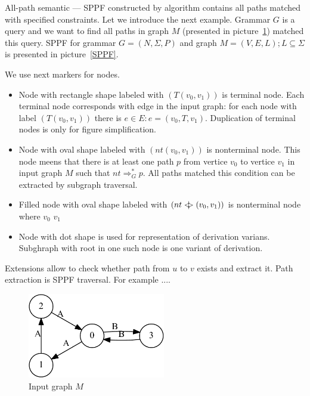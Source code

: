 \documentclass{sig-alternate} %
\begin{document}
All-path semantic --- SPPF constructed by algorithm contains all paths matched with specified constraints. 
Let we introduce the next example. Grammar $G$ is a query and we want to find all paths in graph $M$ (presented in picture~\ref{input}) matched this query. SPPF for grammar $G = (N, \Sigma ,P)$ and graph $M = (V,E,L); L \subseteq \Sigma$ 
is presented in picture~\ref{SPPF}. 

We use next markers for nodes.
\begin{itemize}
    \item Node with rectangle shape labeled with $(T (v_0, v_1))$ is terminal node. Each terminal node corresponds with edge in the input graph: for each node with label $(T (v_0, v_1))$ there is $e\in E: e=(v_0,T,v_1)$.
    Duplication of terminal nodes is only for figure simplification.
    \item Node with oval shape labeled with $(nt (v_0, v_1))$ is nonterminal node. 
    This node meens that there is at least one path $p$ from vertice $v_0$ to vertice $v_1$ in input graph $M$ such that $nt \Rightarrow^*_G p$.
    All paths matched this condition can be extracted by subgraph traversal. 
    \item Filled node with oval shape labeled with $(nt <\mkern-11mu | \mkern-11mu> (v_0, v_1))$ is nonterminal node where $v_0$ $v_1$    
    \item Node with dot shape is used for representation of derivation varians. Subghraph with root in one such node is one variant of derivation. 
\end{itemize}
Extensions allow to check whether path from $u$ to $v$ exists and extract it. Path extraction is SPPF traversal. For example ....

\begin{figure}[h]
    \begin{center}
        \includegraphics[width=6cm]{dot/input.pdf}
        \caption{Input graph $M$}
        \label{input}        
    \end{center}
\end{figure}
\end{document}
